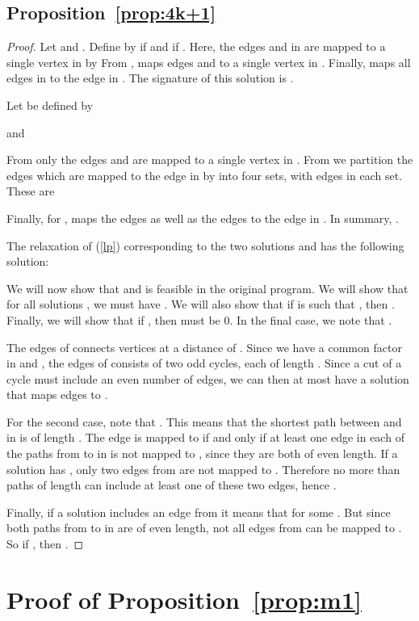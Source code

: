 \documentclass[11pt,a4paper]{article}
\begin{document}
\subsection*{Proposition~\ref{prop:4k+1}}
\begin{proof}
Let  and . 
Define  by  if  and  if .
Here, the edges  and 
 in  are mapped to a single vertex in  by 
From ,  maps edges  and  to a single 
vertex in .
Finally,  maps all edges in  to the edge in .
The signature of this solution is .

Let  be defined by

and 

From  only the edges  and  are mapped to
a single vertex in . From  we partition the edges which are mapped to
the edge in  by  into four sets, with  edges in each set. These are




Finally, for ,  maps the  edges 
 as well as the  edges 
 to the edge in .
In summary, .

The relaxation of (\ref{lp}) corresponding to the two solutions  and  has
the following solution:

We will now show that  and  is feasible in
the original program.
We will show that for all solutions , we must have .
We will also show that if  is such that , then
.
Finally, we will show that if , then  must be 0.
In the final case, we note that .

The edges of  connects vertices at a distance of .
Since we have a common factor  in  and ,
the edges of  consists of two odd cycles, each of length .
Since a cut of a cycle must include an even number of edges, 
we can then at most have a solution that maps  edges to .

For the second case, 
note that . 
This means that the shortest path between  and  in 
is of length . The edge  is mapped to  
if and only if at least one edge in each of the paths from  to  in
  is not mapped to , since they are both of even length.
If a solution  has , only two edges from  are
 not mapped to .
Therefore no more than  paths of length  can include 
at least one of these two edges, hence .

Finally, if a solution  includes an edge from  it means that 
 for some .
But since both paths from  to  in  are of even length,
not all edges from  can be mapped to . 
So if , then .

\end{proof}

\section{Proof of Proposition~\ref{prop:m1}} \label{app:propm1proof}
\end{document}
